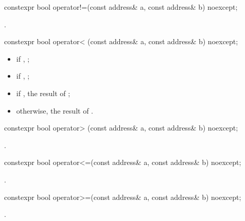 %
\begin{itemdecl}
constexpr bool operator!=(const address& a, const address& b) noexcept;
\end{itemdecl}

\begin{itemdescr}
\pnum
\returns {}.
\end{itemdescr}

%
\begin{itemdecl}
constexpr bool operator< (const address& a, const address& b) noexcept;
\end{itemdecl}

\begin{itemdescr}
\pnum
\returns
\begin{itemize}
\item
 if , ;
\item
 if , ;
\item
 if , the result of ;
\item
 otherwise, the result of .
\end{itemize}
\end{itemdescr}

%
\begin{itemdecl}
constexpr bool operator> (const address& a, const address& b) noexcept;
\end{itemdecl}

\begin{itemdescr}
\pnum
\returns {}.
\end{itemdescr}

%
\begin{itemdecl}
constexpr bool operator<=(const address& a, const address& b) noexcept;
\end{itemdecl}

\begin{itemdescr}
\pnum
\returns {}.
\end{itemdescr}

%
\begin{itemdecl}
constexpr bool operator>=(const address& a, const address& b) noexcept;
\end{itemdecl}

\begin{itemdescr}
\pnum
\returns {}.
\end{itemdescr}



